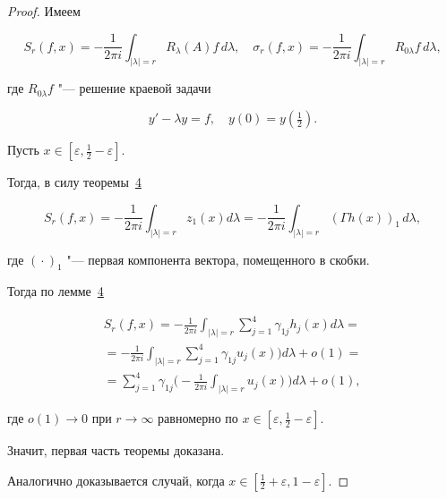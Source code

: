 \begin{proof}

Имеем 

$$S_r(f,x)=-\frac{1}{2\pi i}\int _{|\lambda|=r} R_\lambda(A)f \,d\lambda,\quad 

\sigma_r(f,x)=-\frac{1}{2\pi i}\int_{|\lambda|=r} R_{0\lambda}f \,d\lambda,$$ 

где $R_{0\lambda}f$ "--- решение краевой задачи

$$

y'-\lambda y=f,

\quad  y(0)=y(\tfrac{1}{2}).

$$



Пусть $x \in [\varepsilon,\frac{1}{2}-\varepsilon]$. 

Тогда, в силу теоремы~\hyperlink{kor:th4}{4} 

$$

S_r(f,x)=-\frac{1}{2\pi i}\int _{|\lambda|=r}z_1(x) d\lambda=-\frac{1}{2\pi i}\int_{|\lambda|=r}\left(\Gamma h(x)\right)_1\, d\lambda,

$$

где $( {}\cdot {})_1$ "--- первая компонента вектора, помещенного в скобки.



Тогда по лемме~\hyperlink{kor:lemma4}{4}

\begin{multline}

S_r(f,x)=-\frac{1}{2\pi i}\int _{|\lambda|=r}\sum\limits_{j=1}^{4}\gamma_{1j}h_j(x) d\lambda= \\ =

-\frac{1}{2\pi i}\int _{|\lambda|=r}\sum\limits_{j=1}^{4}\gamma_{1j}u_j(x)) d\lambda+o(1)=

\\ 

=

\sum\limits_{j=1}^{4}\gamma_{1j} 

\biggl(-\frac{1}{2\pi i}\int _{|\lambda|=r}u_j(x) \biggr) d\lambda+o(1),

\end{multline}

где $ o(1)\to 0$ при $r\to \infty$ равномерно по $x\in[\varepsilon,\frac{1}{2}-\varepsilon]$. 

Значит, первая часть теоремы доказана.



Аналогично доказывается случай, когда $x\in[\frac{1}{2}+\varepsilon,1-\varepsilon]$.

\end{proof}





